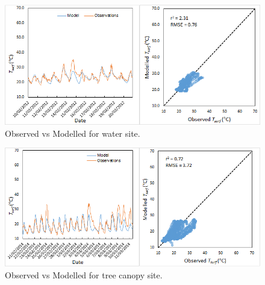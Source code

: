 \documentclass[final,3p,times,authoryear]{elsarticle}
\begin{document}
%
%
%



\begin{figure}[!htbp]
\includegraphics[trim=0mm 0mm 0mm 0mm, clip,scale=0.5]{images/waterobs.png}
 \caption{Observed vs Modelled  for water site.} \label{fig:waterobs}
\end{figure}



\begin{figure}[!htbp]
\includegraphics[trim=0mm 0mm 0mm 0mm, clip,scale=0.5]{images/treeobs.png}
 \caption{Observed vs Modelled  for tree canopy site.} \label{fig:treeobs}
\end{figure}
\end{document}
